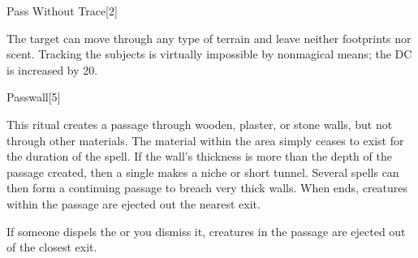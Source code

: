 \begin{spellsection}{Pass Without Trace}[2]
    \begin{spellheader}
    \end{spellheader}
    \begin{spellcontent}
        \begin{spelltargetinginfo}
        \end{spelltargetinginfo}
        \begin{spelleffects}

            \spelleffect The target can move through any type of terrain and leave neither footprints nor scent. Tracking the subjects is virtually impossible by nonmagical means; the DC is increased by 20.
            \spelldur \durlong \dismissable
        \end{spelleffects}
    \end{spellcontent}
    \begin{spellfooter}
    \end{spellfooter}
\end{spellsection}

\begin{spellsection}{Passwall}[5]
    \begin{spellheader}
    \end{spellheader}
    \begin{spellcontent}
        \begin{spelltargetinginfo}
        \end{spelltargetinginfo}
        \begin{spelleffects}

            \spellline
            \spelleffect This ritual creates a passage through wooden, plaster, or stone walls, but not through other materials. The material within the area simply ceases to exist for the duration of the spell. If the wall's thickness is more than the depth of the passage created, then a single  makes a niche or short tunnel. Several  spells can then form a continuing passage to breach very thick walls. When  ends, creatures within the passage are ejected out the nearest exit.
            \spelldur \durext \dismissable
        \end{spelleffects}
    \end{spellcontent}
    \begin{spellfooter}
        \spellnotes If someone dispels the  or you dismiss it, creatures in the passage are ejected out of the closest exit.
    \end{spellfooter}
\end{spellsection}

